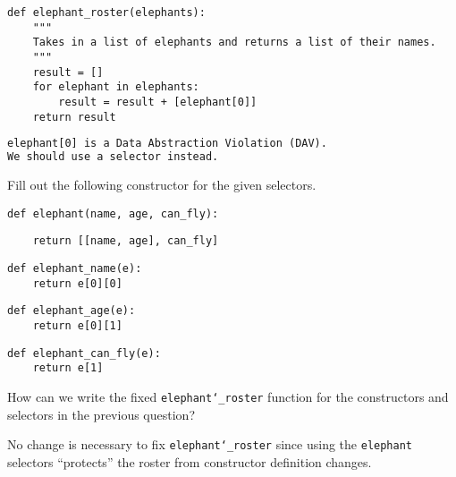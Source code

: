 \documentclass{exam}
\begin{document}
\begin{questions}
\begin{blocksection}
\begin{lstlisting}
def elephant_roster(elephants):
    """
    Takes in a list of elephants and returns a list of their names.
    """
    result = []
    for elephant in elephants:
        result = result + [elephant[0]]
    return result
\end{lstlisting}
\begin{solution}[1in]
\begin{lstlisting}[language=HTML]
elephant[0] is a Data Abstraction Violation (DAV).
We should use a selector instead.
\end{lstlisting}
\end{solution}

\end{blocksection}


\begin{blocksection}
\question Fill out the following constructor for the given selectors.

\begin{lstlisting}
def elephant(name, age, can_fly):
\end{lstlisting}
\begin{solution}[1in]
\begin{lstlisting}
    return [[name, age], can_fly]
\end{lstlisting}
\end{solution}

\begin{lstlisting}
def elephant_name(e):
    return e[0][0]
\end{lstlisting}

\begin{lstlisting}
def elephant_age(e):
    return e[0][1]
\end{lstlisting}

\begin{lstlisting}
def elephant_can_fly(e):
    return e[1]
\end{lstlisting}

\end{blocksection}


\begin{blocksection}
\question How can we write the fixed \texttt{elephant\char`_roster} function for
the constructors and selectors in the previous question?

\begin{solution}[2in]
No change is necessary to fix \texttt{elephant\char`_roster} since using the
\texttt{elephant} selectors ``protects'' the roster from constructor definition
changes.
\end{solution}


\end{blocksection}
\end{questions}
\end{document}
